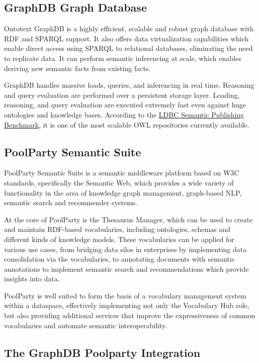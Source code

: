 \documentclass[
  super,
  preprint,
  3p]{elsarticle}
\begin{document}
\subsection{GraphDB Graph Database}\label{graphdb-graph-database}

Ontotext GraphDB is a highly efficient, scalable and robust graph
database with RDF and SPARQL support. It also offers data virtualization
capabilities which enable direct access using SPARQL to relational
databases, eliminating the need to replicate data. It can perform
semantic inferencing at scale, which enables deriving new semantic facts
from existing facts.

GraphDB handles massive loads, queries, and inferencing in real time.
Reasoning and query evaluation are performed over a persistent storage
layer. Loading, reasoning, and query evaluation are executed extremely
fast even against huge ontologies and knowledge bases. According to the
\href{https://ldbcouncil.org/benchmarks/spb/}{LDBC Semantic Publishing
Benchmark}, it is one of the most scalable OWL repositories currently
available.

\subsection{PoolParty Semantic Suite}\label{poolparty-semantic-suite}

PoolParty Semantic Suite is a semantic middleware platform based on W3C
standards, specifically the Semantic Web, which provides a wide variety
of functionality in the area of knowledge graph management, graph-based
NLP, semantic search and recommender systems.

At the core of PoolParty is the Thesaurus Manager, which can be used to
create and maintain RDF-based vocabularies, including ontologies,
schemas and different kinds of knowledge models. These vocabularies can
be applied for various use cases, from bridging data silos in
enterprises by implementing data consolidation via the vocabularies, to
annotating documents with semantic annotations to implement semantic
search and recommendations which provide insights into data.

PoolParty is well suited to form the basis of a vocabulary management
system within a dataspace, effectively implementing not only the
Vocabulary Hub role, but also providing additional services that improve
the expressiveness of common vocabularies and automate semantic
interoperability.

\subsection{The GraphDB Poolparty
Integration}\label{the-graphdb-poolparty-integration}
\end{document}

